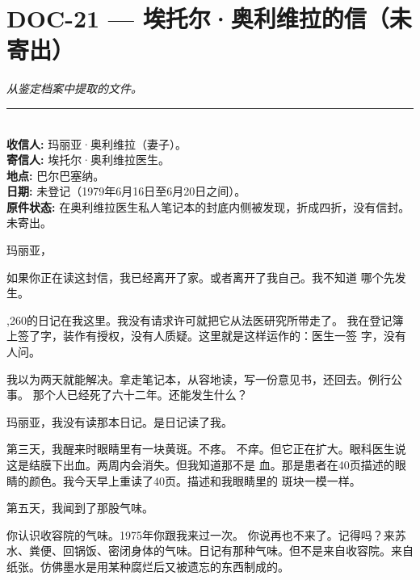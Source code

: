 \section*{\textbf{DOC-21} --- 埃托尔·奥利维拉的信（未寄出）}

\noindent \textit{从鉴定档案中提取的文件。}

\vspace{0.5em}\noindent\rule{\textwidth}{0.5pt}\vspace{0.5em}


\\[-0.2em]

\noindent \textbf{收信人:} 玛丽亚·奥利维拉（妻子）。\\
\noindent \textbf{寄信人:} 埃托尔·奥利维拉医生。\\
\noindent \textbf{地点:} 巴尔巴塞纳。\\
\noindent\textbf{日期:} 未登记（1979年6月16日至6月20日之间）。\\
\noindent\textbf{原件状态:} 在奥利维拉医生私人笔记本的封底内侧被发现，折成四折，没有信封。未寄出。

\noindent 玛丽亚，

\noindent 如果你正在读这封信，我已经离开了家。或者离开了我自己。我不知道
\noindent 哪个先发生。

,260的日记在我这里。我没有请求许可就把它从法医研究所带走了。
\noindent 我在登记簿上签了字，装作有授权，没有人质疑。这里就是这样运作的：医生一签
\noindent 字，没有人问。

\noindent 我以为两天就能解决。拿走笔记本，从容地读，写一份意见书，还回去。例行公事。
\noindent 那个人已经死了六十二年。还能发生什么？

\noindent 玛丽亚，我没有读那本日记。是日记读了我。

\noindent 第三天，我醒来时眼睛里有一块黄斑。不疼。
\noindent 不痒。但它正在扩大。眼科医生说这是结膜下出血。两周内会消失。但我知道那不是
\noindent 血。那是患者在40页描述的眼睛的颜色。我今天早上重读了40页。描述和我眼睛里的
\noindent 斑块一模一样。

\noindent 第五天，我闻到了那股气味。

\noindent 你认识收容院的气味。1975年你跟我来过一次。
\noindent 你说再也不来了。记得吗？来苏水、粪便、回锅饭、密闭身体的气味。日记有那种气味。但不是来自收容院。来自纸张。仿佛墨水是用某种腐烂后又被遗忘的东西制成的。

